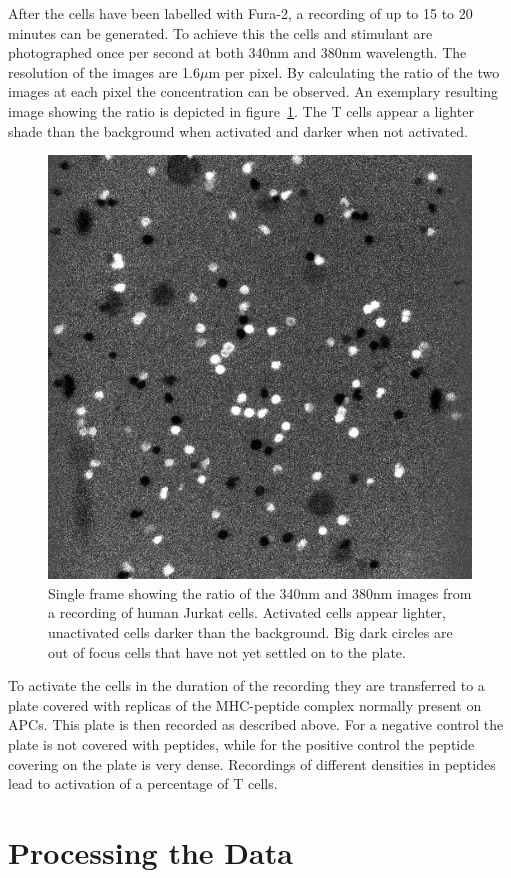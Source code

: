 After the cells have been labelled with Fura-2, a recording of up to 15 to 20 minutes can be generated. To achieve this the cells and stimulant are photographed once per second at both 340nm and 380nm wavelength. The resolution of the images are 1.6$\mu$m per pixel. By calculating the ratio of the two images at each pixel the \Calcium concentration can be observed. An exemplary resulting image showing the ratio is depicted in figure~\ref{fig:example_ratio_img}. The T cells appear a lighter shade than the background when activated and darker when not activated.

\begin{figure}[h!]
	\centering
	\includegraphics[width=0.55\linewidth]{fig/frame_ratio.jpg}
	\caption{Single frame showing the ratio of the 340nm and 380nm images from a recording of human Jurkat cells. Activated cells appear lighter, unactivated cells darker than the background. Big dark circles are out of focus cells that have not yet settled on to the plate.}
	\label{fig:example_ratio_img}
\end{figure}

To activate the cells in the duration of the recording they are transferred to a plate covered with replicas of the MHC-peptide complex normally present on APCs. This plate is then recorded as described above. For a negative control the plate is not covered with peptides, while for the positive control the peptide covering on the plate is very dense. Recordings of different densities in peptides lead to activation of a percentage of T cells.

\section{Processing the Data}

